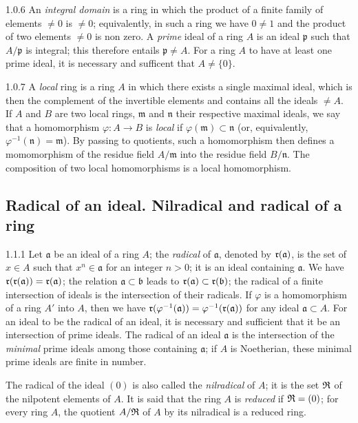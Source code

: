 \documentclass{book}
\begin{document}
\begin{env}{1.0.6}
\label{env-0.1.0.6}
An \emph{integral domain} is a ring in which the product of a finite family of elements
$\neq 0$ is $\neq 0$; equivalently, in such a ring we have $0\neq 1$ and the product of
two elements $\neq 0$ is non zero. A \emph{prime} ideal of a ring $A$ is an ideal $\mathfrak{p}$
such that $A/\mathfrak{p}$ is integral; this therefore entails $\mathfrak{p}\neq A$. For a ring $A$ to
have at least one prime ideal, it is necessary and sufficent that $A\neq\{0\}$.
\end{env}

\begin{env}{1.0.7}
\label{env-0.1.0.7}
A \emph{local} ring is a ring $A$ in which there exists a single maximal ideal, which is then
the complement of the invertible elements and contains all the ideals $\neq A$. If $A$ and $B$
are two local rings, $\mathfrak{m}$ and $\mathfrak{n}$ their respective maximal ideals, we say that a
homomorphism $\varphi\colon A\to B$ is \emph{local} if $\varphi(\mathfrak{m})\subset\mathfrak{n}$ (or, equivalently,
$\varphi^{-1}(\mathfrak{n})=\mathfrak{m}$). By passing to quotients, such a homomorphism then defines
a momomorphism of the residue field $A/\mathfrak{m}$ into the residue field $B/\mathfrak{n}$. The
composition of two local homomorphisms is a local homomorphism.
\end{env}

\subsection{Radical of an ideal. Nilradical and radical of a ring}
\label{0-prelim-1.1}

\begin{env}{1.1.1}
\label{env-0.1.1.1}
Let $\mathfrak{a}$ be an ideal of a ring $A$; the \emph{radical} of $\mathfrak{a}$, denoted
by $\mathfrak{r}(\mathfrak{a})$, is the set of $x\in A$ such that $x^n\in\mathfrak{a}$ for
an integer $n>0$; it is an ideal containing $\mathfrak{a}$. We have
$\mathfrak{r}(\mathfrak{r}(\mathfrak{a}))=\mathfrak{r}(\mathfrak{a})$; the relation
$\mathfrak{a}\subset\mathfrak{b}$ leads to $\mathfrak{r}(\mathfrak{a})\subset\mathfrak{r}(\mathfrak{b})$;
the radical of a finite intersection of ideals is the intersection of their radicals. If $\varphi$
is a homomorphism of a ring $A'$ into $A$, then we have
$\mathfrak{r}(\varphi^{-1}(\mathfrak{a}))=\varphi^{-1}(\mathfrak{r}(\mathfrak{a}))$
for any ideal $\mathfrak{a}\subset A$. For an ideal to be the radical of an ideal,
it is necessary and sufficient that it be an intersection of prime ideals. The radical of an
ideal $\mathfrak{a}$ is the intersection of the
\emph{minimal} prime ideals among those containing $\mathfrak{a}$; if $A$ is
Noetherian, these minimal prime ideals are finite in number.

The radical of the ideal $(0)$ is also called the \emph{nilradical} of $A$; it is the set
$\mathfrak{R}$ of the nilpotent elements of $A$. It is said that the ring $A$ is \emph{reduced} if
$\mathfrak{R}=(0)$; for every ring $A$, the quotient $A/\mathfrak{R}$ of $A$ by its nilradical is a
reduced ring.
\end{env}
\end{document}
